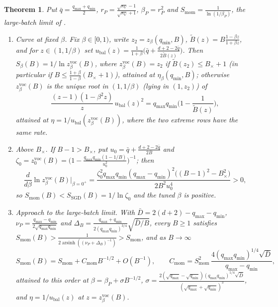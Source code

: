 \documentclass[11pt]{article}
\newtheorem{theorem}{Theorem}
\begin{document}
\begin{theorem}\label{thm:curve}
Put $\bar q=\frac{q_{\max}+q_{\min}}{2}$, $r_P=\frac{\sqrt{\kappa_V}-1}{\sqrt{\kappa_V}+1}$, $\beta_P=r_P^2$ and $S_{\mathrm{mom}}=\frac1{\ln(1/\beta_P)}$, the large-batch limit of \citet[Proposition~H.15(i)]{everett2026sparse}.
\begin{enumerate}
\item[(a)] \emph{Curve at fixed $\beta$.} Fix $\beta\in[0,1)$, write $z_2=z_\beta(q_{\min},B)$, $\tilde B(z)=B\frac{1-\beta z}{1+\beta z}$, and for $z\in(1,1/\beta)$ set $u_{\mathrm{bal}}(z)=\frac1{1+\beta}\big(\bar q+\frac{d+2-2\bar q}{2\tilde B(z)}\big)$. Then $S_\beta(B)=1/\ln z^{\mathrm{voc}}_\beta(B)$, where $z^{\mathrm{voc}}_\beta(B)=z_2$ if $\tilde B(z_2)\le B_\times+1$ (in particular if $B\le\frac{1+\beta}{1-\beta}(B_\times+1)$), attained at $\eta_\beta(q_{\min},B)$; otherwise $z^{\mathrm{voc}}_\beta(B)$ is the unique root in $(1,1/\beta)$ (lying in $(1,z_2)$) of
\[
\frac{(z-1)(1-\beta^2z)}{z}\,u_{\mathrm{bal}}(z)^2=q_{\max}q_{\min}\Big(1-\frac1{\tilde B(z)}\Big),
\]
attained at $\eta=1/u_{\mathrm{bal}}(z^{\mathrm{voc}}_\beta(B))$, where the two extreme rows have the same rate.
\item[(b)] \emph{Above $B_\times$.} If $B-1>B_\times$, put $u_0=\bar q+\frac{d+2-2\bar q}{2B}$ and $\zeta_0=z^{\mathrm{voc}}_0(B)=\big(1-\frac{q_{\max}q_{\min}(1-1/B)}{u_0^2}\big)^{-1}$; then
\[
\frac{d}{d\beta}\ln z^{\mathrm{voc}}_\beta(B)\Big|_{\beta=0^+}=\frac{\zeta_0^2q_{\max}q_{\min}(q_{\max}-q_{\min})^2\big((B-1)^2-B_\times^2\big)}{2B^2u_0^4}>0,
\]
so $S_{\mathrm{mom}}(B)<S_{\mathrm{SGD}}(B)=1/\ln\zeta_0$ and the tuned $\beta$ is positive.
\item[(c)] \emph{Approach to the large-batch limit.} With $\bar D=2(d+2)-q_{\max}-q_{\min}$, $\nu_P=\frac{q_{\max}-q_{\min}}{2\sqrt{q_{\max}q_{\min}}}$ and $\Delta_B=\frac{q_{\max}+q_{\min}}{2(q_{\max}q_{\min})^{3/4}}\sqrt{\bar D/B}$, every $B\ge1$ satisfies $S_{\mathrm{mom}}(B)>\frac1{2\operatorname{arsinh}((\nu_P+\Delta_B)^{-1})}>S_{\mathrm{mom}}$, and as $B\to\infty$
\[
S_{\mathrm{mom}}(B)=S_{\mathrm{mom}}+C_{\mathrm{mom}}B^{-1/2}+O(B^{-1}),\qquad C_{\mathrm{mom}}=S_{\mathrm{mom}}^2\,\frac{4(q_{\max}q_{\min})^{1/4}\sqrt{\bar D}}{q_{\max}-q_{\min}},
\]
attained to this order at $\beta=\beta_P+\sigma B^{-1/2}$, $\sigma=\frac{2(\sqrt{q_{\max}}-\sqrt{q_{\min}})(q_{\max}q_{\min})^{1/4}\sqrt{\bar D}}{(\sqrt{q_{\max}}+\sqrt{q_{\min}})^3}$, and $\eta=1/u_{\mathrm{bal}}(z)$ at $z=z^{\mathrm{voc}}_\beta(B)$.
\end{enumerate}
\end{theorem}
\end{document}
